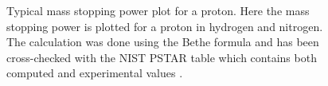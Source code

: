 \begin{figure}[!ht]
	
	\caption[Typical mass stopping power plot a proton]{Typical mass stopping power plot for a proton. Here the mass stopping power is plotted for a proton in hydrogen and nitrogen. The calculation was done using the Bethe formula and has been cross-checked with the NIST PSTAR table which contains both computed and experimental values \cite{Seltzer1993}.}%
	\label{chap3:bethe1}
\end{figure}
